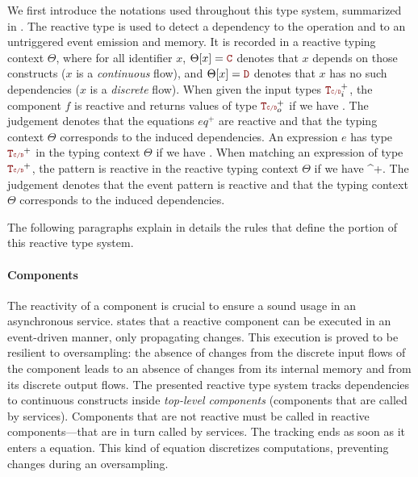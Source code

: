 We first introduce the notations used throughout this type system, summarized in
.
%
The reactive type \rType is used to detect a dependency to the \timeop operation and to an
untriggered event emission and  memory. It is recorded in a reactive typing context
$\Theta$, where for all identifier $x$, $\Theta[x] = \cType$ denotes that $x$ depends on those
constructs ($x$ is a \emph{continuous} flow), and $\Theta[x] = \dType$ denotes that $x$ has no such
dependencies ($x$ is a \emph{discrete} flow).
%
When given the input types $\rType_i^+$, the component $f$ is reactive and returns values of type
$\rType_o^+$ if we have .
%
The judgement  denotes that the equations $eq^+$ are reactive and that
the typing context $\Theta$ corresponds to the induced dependencies.
%
An expression $e$ has type $\rType^+$ in the typing context $\Theta$ if we have
.
%
When matching an expression of type $\rType^+$, the pattern  is reactive in
the reactive typing context $\Theta$ if we have 
{\rType^+}.
%
The judgement  denotes that the event pattern
 is reactive and that the typing context $\Theta$ corresponds to the induced
dependencies.

The following paragraphs explain in details the rules that define the \GRSync portion of this
reactive type system.

\paragraph{Components}

The reactivity of a component is crucial to ensure a sound usage in an asynchronous service.
 states that a reactive component can be executed
in an event-driven manner, only propagating changes. This execution is proved to be resilient to
oversampling: the absence of changes from the discrete input flows of the component leads to an
absence of changes from its internal memory and from its discrete output flows. The presented
reactive type system tracks dependencies to continuous constructs inside \emph{top-level
    components} (\ie components that are called by services). Components that are not reactive must
be called in reactive components---that are in turn called by services. The tracking ends as soon as
it enters a  equation. This kind of equation discretizes computations, preventing changes
during an oversampling.

